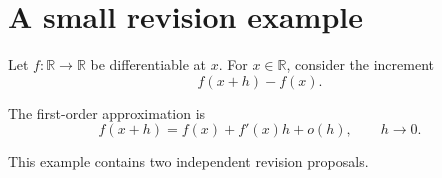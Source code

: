 \documentclass{article}
\begin{document}
\section{A small revision example}
Let \(f:\mathbb R\to\mathbb R\) be differentiable at \(x\).
For \(x\in\mathbb R\), consider the increment
\[
  f(x+h)-f(x).
\]

The first-order approximation is
\[
  f(x+h)=f(x)+f'(x)h+o(h),\qquad h\to0.
\]

This example contains two independent revision proposals.
\end{document}

